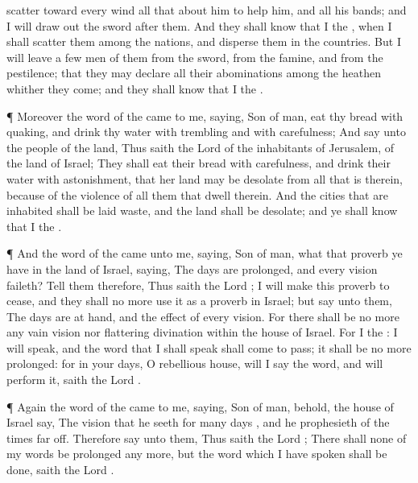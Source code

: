 {scatter toward every
wind all that
{}
about him to
help him, and all his
bands; and I will draw
out the
sword
after them.
And they shall
know that I
{} the
{}, when I shall
scatter them among the
nations, and
disperse them in the
countries.
But I will
leave a
few
men of them from the
sword, from the
famine, and from the
pestilence; that they may
declare all their
abominations among the
heathen whither they
come; and they shall
know that I
{} the
{}.
\par }{\PP {}¶ Moreover the
word of the
{} came to me,
saying,
Son of
man,
eat thy
bread with
quaking, and
drink thy
water with
trembling and with
carefulness;
And
say unto the
people of the
land, Thus
saith the
Lord
{} of the
inhabitants of
Jerusalem,
{} of the
land of
Israel; They shall
eat their
bread with
carefulness, and
drink their
water with
astonishment, that her
land may be
desolate from all that is
therein, because of the
violence of all them that
dwell therein.
And the
cities that are
inhabited shall be laid
waste, and the
land shall be
desolate; and ye shall
know that I
{} the
{}.
\par }{\PP {}¶ And the
word of the
{} came unto me,
saying,
Son of
man, what
{} that
proverb
{} ye have in the
land of
Israel,
saying, The
days are
prolonged, and every
vision
faileth?
Tell them therefore, Thus
saith the
Lord
{}; I will make this
proverb to
cease, and they shall no more use it as a
proverb in
Israel; but
say unto them, The
days are at
hand, and the
effect of every
vision.
For there shall be no more any
vain
vision nor
flattering
divination
within the
house of
Israel.
For I
{} the
{}: I will
speak, and the
word that I shall
speak shall come to
pass; it shall be no more
prolonged: for in your
days, O
rebellious
house, will I
say the
word, and will
perform it,
saith the
Lord
{}.
\par }{\PP {}¶ Again the
word of the
{} came to me,
saying,
Son of
man, behold,
{} the
house of
Israel
say, The
vision that he
seeth
{} for
many
days
{}, and he
prophesieth of the
times
{}
far off.
Therefore
say unto them, Thus
saith the
Lord
{}; There shall none of my
words be
prolonged any more, but the
word which I have
spoken shall be
done,
saith the
Lord
{}.

}
